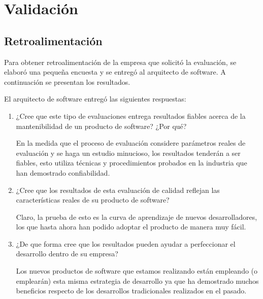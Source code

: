 \chapter{Validación}
\label{chap:validacion}
\section{Retroalimentación}

Para obtener retroalimentación de la empresa que solicitó la evaluación, se elaboró una
pequeña encuesta y se entregó al arquitecto de software.
A continuación se presentan los resultados.

El arquitecto de software entregó las siguientes respuestas:
\begin{enumerate}
    \item ¿Cree que este tipo de evaluaciones entrega resultados fiables acerca de la mantenibilidad de un producto de software? ¿Por qué?

En la medida que el proceso de evaluación considere parámetros reales de evaluación y
se haga un estudio minucioso, los resultados tenderán a ser fiables,
esto utiliza técnicas y procedimientos probados en la industria que han demostrado confiabilidad.

\item ¿Cree que los resultados de esta evaluación de calidad reflejan las características reales de su producto de software?

Claro, la prueba de esto es la curva de aprendizaje de nuevos desarrolladores,
los que hasta ahora han podido adoptar el producto de manera muy fácil.

\item ¿De que forma cree que los resultados pueden ayudar a perfeccionar el desarrollo dentro de su empresa?

Los nuevos productos de software que estamos realizando están empleando (o emplearán)
esta misma estrategia de desarrollo ya que ha demostrado muchos beneficios
respecto de los desarrollos tradicionales realizados en el pasado.
\end{enumerate}
